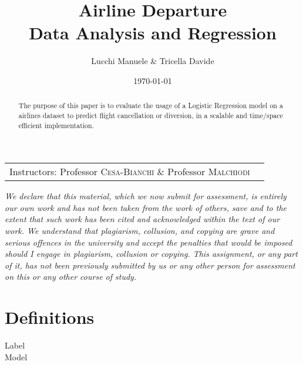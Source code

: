 \documentclass[
	letterpaper, %
	10pt, %
]{class}
\title{Airline Departure\\Data Analysis and Regression} %
\author{Lucchi Manuele \& Tricella Davide} %
\date{\today} %
\begin{document}
\maketitle %

\begin{center}
	\begin{tabular}{l r}
		Instructors: Professor \textsc{Cesa-Bianchi} \& Professor \textsc{Malchiodi}
	\end{tabular}
\end{center}


\textit{We declare that this material,
	which we now submit for assessment, is entirely our own work and has not been
	taken from the work of others, save and to the extent that such work has been cited and
	acknowledged within the text of our work. We understand that plagiarism, collusion,
	and copying are grave and serious offences in the university and accept the penalties that
	would be imposed should I engage in plagiarism, collusion or copying. This assignment,
	or any part of it, has not been previously submitted by us or any other person for
	assessment on this or any other course of study.}

\tableofcontents


\begin{abstract}
	The purpose of this paper is to evaluate the usage of a Logistic Regression model on a airlines dataset to predict flight cancellation or diversion, in a scalable and time/space efficient implementation.
\end{abstract}

\section{Definitions}\label{definitions} %

\begin{description}
	\item[Label]
	\item[Model]
\end{description}
\end{document}
